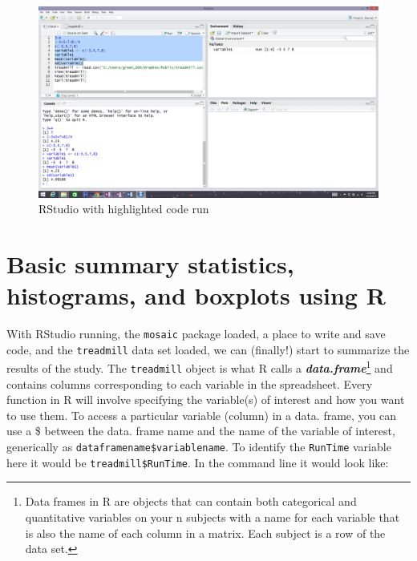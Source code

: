 \documentclass[]{book}
\newenvironment{Shaded}{\begin{snugshade}}{\end{snugshade}}
\newcommand{\NormalTok}[1]{{#1}}
\let\rmarkdownfootnote\footnote%
\def\footnote{\protect\rmarkdownfootnote}
\begin{document}
\begin{figure}
\includegraphics[width=26.67in]{chapter0_files/image006} \caption{RStudio with highlighted code run}\label{fig:Figure4}
\end{figure}

\section{Basic summary statistics, histograms, and boxplots using
R}\label{basic-summary-statistics-histograms-and-boxplots-using-r}

With RStudio running, the \texttt{mosaic} package loaded, a place to
write and save code, and the \texttt{treadmill} data set loaded, we can
(finally!) start to summarize the results of the study. The
\texttt{treadmill} object is what R calls a
\textbf{\emph{data.frame}}\footnote{Data frames in R are objects that
  can contain both categorical and quantitative variables on your n
  subjects with a name for each variable that is also the name of each
  column in a matrix. Each subject is a row of the data set.} and
contains columns corresponding to each variable in the spreadsheet.
Every function in R will involve specifying the variable(s) of interest
and how you want to use them. To access a particular variable (column)
in a data. frame, you can use a \$ between the data. frame name and the
name of the variable of interest, generically as
\texttt{dataframename\$variablename}. To identify the \texttt{RunTime}
variable here it would be \texttt{treadmill\$RunTime}. In the command
line it would look like:

\begin{Shaded}
\end{Shaded}
\end{document}
